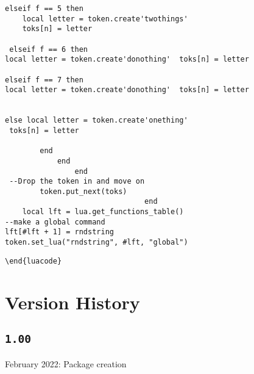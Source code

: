 \documentclass{article}
\begin{document}
\begin{verbatim}
elseif f == 5 then
	local letter = token.create'twothings' 
	toks[n] = letter
               
 elseif f == 6 then
local letter = token.create'donothing'  toks[n] = letter

elseif f == 7 then
local letter = token.create'donothing'  toks[n] = letter


else local letter = token.create'onething'
 toks[n] = letter
 
		end
			end
				end
 --Drop the token in and move on
        token.put_next(toks)
								end
	local lft = lua.get_functions_table()
--make a global command
lft[#lft + 1] = rndstring
token.set_lua("rndstring", #lft, "global")
\end{verbatim}
\begin{verbatim}
\end{luacode}
\end{verbatim}
\clearpage
\section{Version History}
\subsection{\texttt{1.00}}
 February 2022: Package creation

	
\end{document}
